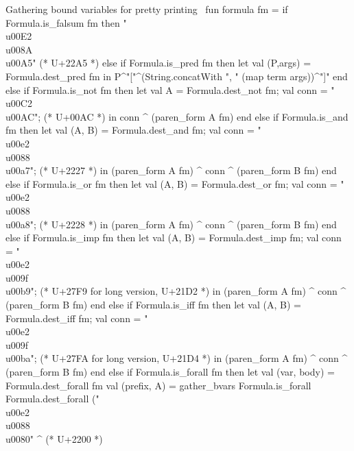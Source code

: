 \nwenddocs{}\endmoddef\nwstartdeflinemarkup{}\nwenddeflinemarkup
\LA{}Gathering bound variables for pretty printing~{\nwtagstyle{}}\RA{}
fun formula fm =
  if Formula.is_falsum fm
  then "\\u00E2\\u008A\\u00A5" (* U+22A5 *)
  else if Formula.is_pred fm
  then let val (P,args) = Formula.dest_pred fm
       in P^"["^(String.concatWith ", " (map term args))^"]" end
  else if Formula.is_not fm
  then let val A = Formula.dest_not fm;
           val conn = "\\u00C2\\u00AC"; (* U+00AC *)
       in conn ^ (paren_form A fm) end
  else if Formula.is_and fm
  then let val (A, B) = Formula.dest_and fm;
           val conn = "\\u00e2\\u0088\\u00a7"; (* U+2227 *)
       in (paren_form A fm) ^ conn ^ (paren_form B fm) end
  else if Formula.is_or fm
  then let val (A, B) = Formula.dest_or fm;
           val conn = "\\u00e2\\u0088\\u00a8"; (* U+2228 *)
       in (paren_form A fm) ^ conn ^ (paren_form B fm) end
  else if Formula.is_imp fm
  then let val (A, B) = Formula.dest_imp fm;
           val conn = "\\u00e2\\u009f\\u00b9"; (* U+27F9 for long version, U+21D2 *)
       in (paren_form A fm) ^ conn ^ (paren_form B fm) end
  else if Formula.is_iff fm
  then let val (A, B) = Formula.dest_iff fm;
           val conn = "\\u00e2\\u009f\\u00ba"; (* U+27FA for long version, U+21D4 *)
       in (paren_form A fm) ^ conn ^ (paren_form B fm) end
  else if Formula.is_forall fm
  then let
    val (var, body) = Formula.dest_forall fm
    val (prefix, A) = gather_bvars Formula.is_forall
                                   Formula.dest_forall
                                   ("\\u00e2\\u0088\\u0080" ^ (* U+2200 *)
